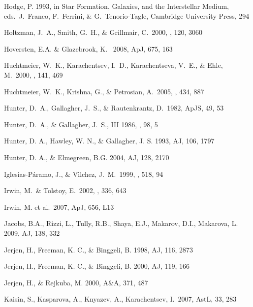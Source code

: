 \documentclass[12pt,preprint]{emulateapj}
\begin{document}
\begin{thebibliography}{}
Hodge, P. 1993, in Star Formation, Galaxies, and the Interstellar Medium,
   eds.\ J.\ Franco, F.\ Ferrini, \& G.\ Tenorio-Tagle, Cambridge University 
   Press, 294

Holtzman, J.~A., Smith, G.~H., \& Grillmair, C.\ 2000, \aj, 120, 3060 

Hoversten, E.A. \& Glazebrook, K. \ 2008, ApJ, 675, 163 

Huchtmeier, W.~K., Karachentsev, I.~D., Karachentseva, V.~E., \& 
   Ehle, M.\ 2000, \aaps, 141, 469 

Huchtmeier, W.~K., Krishna, G., \& Petrosian, A.\ 2005, \aap, 434, 887 

Hunter, D.~A., Gallagher, J.~S., \& Rautenkrantz, D.\ 1982, ApJS, 49, 53

Hunter, D.~A., \& Gallagher, J.~S., III 1986, \pasp, 98, 5 

Hunter, D. A., Hawley, W. N., \& Gallagher, J. S. 1993, AJ, 106, 1797

Hunter, D. A., \& Elmegreen, B.G. 2004, AJ, 128, 2170

Iglesias-P{\'a}ramo, J., \& V{\'{\i}}lchez, J.~M.\ 1999, \apj, 518, 94 

Irwin, M.~\& Tolstoy, E.\ 2002, \mnras, 336, 643 

Irwin, M. et al.\ 2007, ApJ, 656, L13 

Jacobs, B.A., Rizzi, L., Tully, R.B., Shaya, E.J., Makarov, D.I., Makarova, L. 2009, AJ, 138, 332
 
Jerjen, H., Freeman, K. C., \& Binggeli, B. 1998, AJ, 116, 2873

Jerjen, H., Freeman, K. C., \& Binggeli, B. 2000, AJ, 119, 166 
 
Jerjen, H., \& Rejkuba, M. 2000, A\&A, 371, 487 

Kaisin, S., Kasparova, A., Knyazev, A., Karachentsev, I.\ 2007, AstL, 33, 283 


\end{thebibliography}
\end{document}
